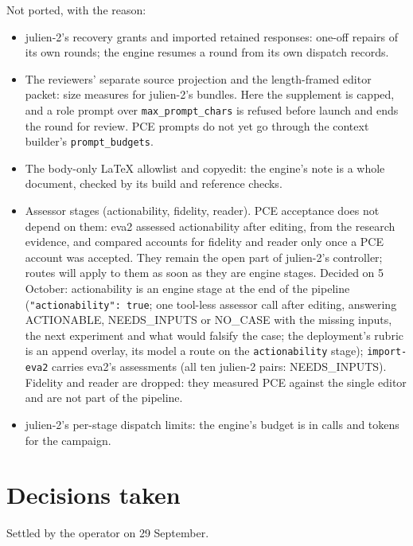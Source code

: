 \documentclass[11pt,a4paper]{article}
\begin{document}
Not ported, with the reason:
\begin{itemize}[nosep]
\item julien-2's recovery grants and imported retained responses: one-off repairs of its own
  rounds; the engine resumes a round from its own dispatch records.
\item The reviewers' separate source projection and the length-framed editor packet: size
  measures for julien-2's bundles. Here the supplement is capped, and a role prompt over
  \texttt{max\_prompt\_chars} is refused before launch and ends the round for review. PCE
  prompts do not yet go through the context builder's \texttt{prompt\_budgets}.
\item The body-only LaTeX allowlist and copyedit: the engine's note is a whole document,
  checked by its build and reference checks.
\item Assessor stages (actionability, fidelity, reader). PCE acceptance does not depend on
  them: eva2 assessed actionability after editing, from the research evidence, and compared
  accounts for fidelity and reader only once a PCE account was accepted. They remain the open
  part of julien-2's controller; routes will apply to them as soon as they are engine stages.
  Decided on 5 October: actionability is an engine stage at the end of the pipeline
  (\texttt{"actionability": true}; one tool-less assessor call after editing, answering
  ACTIONABLE, NEEDS\_INPUTS or NO\_CASE with the missing inputs, the next experiment and
  what would falsify the case; the deployment's rubric is an append overlay, its model a route
  on the \texttt{actionability} stage); \texttt{import-eva2} carries eva2's assessments (all
  ten julien-2 pairs: NEEDS\_INPUTS). Fidelity and reader are dropped: they measured PCE
  against the single editor and are not part of the pipeline.
\item julien-2's per-stage dispatch limits: the engine's budget is in calls and tokens for
  the campaign.
\end{itemize}

\section{Decisions taken}

Settled by the operator on 29 September.
\end{document}
